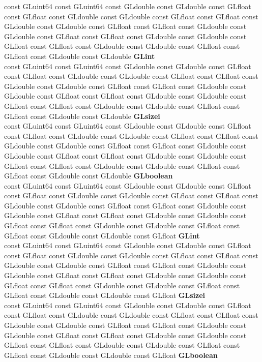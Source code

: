\begin{DoxyCompactItemize}
\begin{tabbing}
\>const GLuint64 const GLuint64 const GLdouble const GLdouble const GLfloat const GLfloat const GLdouble const GLdouble const GLfloat const GLfloat const GLdouble const GLdouble const GLfloat const GLfloat const GLdouble const GLdouble const GLfloat const GLfloat const GLdouble const GLdouble const GLfloat const GLfloat const GLdouble const GLdouble const GLfloat const GLfloat const GLdouble const GLdouble {\bfseries GLint}\\
\>const GLuint64 const GLuint64 const GLdouble const GLdouble const GLfloat const GLfloat const GLdouble const GLdouble const GLfloat const GLfloat const GLdouble const GLdouble const GLfloat const GLfloat const GLdouble const GLdouble const GLfloat const GLfloat const GLdouble const GLdouble const GLfloat const GLfloat const GLdouble const GLdouble const GLfloat const GLfloat const GLdouble const GLdouble {\bfseries GLsizei}\\
\>const GLuint64 const GLuint64 const GLdouble const GLdouble const GLfloat const GLfloat const GLdouble const GLdouble const GLfloat const GLfloat const GLdouble const GLdouble const GLfloat const GLfloat const GLdouble const GLdouble const GLfloat const GLfloat const GLdouble const GLdouble const GLfloat const GLfloat const GLdouble const GLdouble const GLfloat const GLfloat const GLdouble const GLdouble {\bfseries GLboolean}\\
\>const GLuint64 const GLuint64 const GLdouble const GLdouble const GLfloat const GLfloat const GLdouble const GLdouble const GLfloat const GLfloat const GLdouble const GLdouble const GLfloat const GLfloat const GLdouble const GLdouble const GLfloat const GLfloat const GLdouble const GLdouble const GLfloat const GLfloat const GLdouble const GLdouble const GLfloat const GLfloat const GLdouble const GLdouble const GLfloat {\bfseries GLint}\\
\>const GLuint64 const GLuint64 const GLdouble const GLdouble const GLfloat const GLfloat const GLdouble const GLdouble const GLfloat const GLfloat const GLdouble const GLdouble const GLfloat const GLfloat const GLdouble const GLdouble const GLfloat const GLfloat const GLdouble const GLdouble const GLfloat const GLfloat const GLdouble const GLdouble const GLfloat const GLfloat const GLdouble const GLdouble const GLfloat {\bfseries GLsizei}\\
\>const GLuint64 const GLuint64 const GLdouble const GLdouble const GLfloat const GLfloat const GLdouble const GLdouble const GLfloat const GLfloat const GLdouble const GLdouble const GLfloat const GLfloat const GLdouble const GLdouble const GLfloat const GLfloat const GLdouble const GLdouble const GLfloat const GLfloat const GLdouble const GLdouble const GLfloat const GLfloat const GLdouble const GLdouble const GLfloat {\bfseries GLboolean}\\

\end{tabbing}
\end{DoxyCompactItemize}
